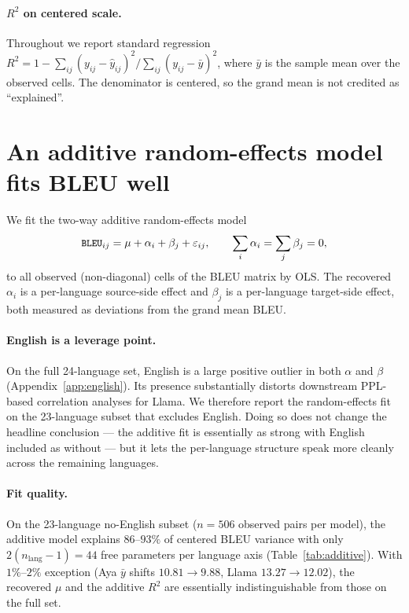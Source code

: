 \documentclass[11pt]{article}
\newcommand{\code}[1]{\texttt{\small #1}}
\begin{document}
\paragraph{$R^2$ on centered scale.}
Throughout we report standard regression $R^2 = 1 - \sum_{ij}(y_{ij} -
\hat y_{ij})^2 / \sum_{ij}(y_{ij} - \bar y)^2$, where $\bar y$ is the
sample mean over the observed cells. The denominator is centered, so
the grand mean is not credited as ``explained''.

\section{An additive random-effects model fits BLEU well}
\label{sec:additive}

We fit the two-way additive random-effects model
\begin{equation}
\code{BLEU}_{ij} = \mu + \alpha_i + \beta_j + \varepsilon_{ij}, \qquad
\sum_i \alpha_i = \sum_j \beta_j = 0,
\label{eq:re}
\end{equation}
to all observed (non-diagonal) cells of the BLEU matrix by OLS. The
recovered $\alpha_i$ is a per-language source-side effect and $\beta_j$
is a per-language target-side effect, both measured as deviations from
the grand mean BLEU.

\paragraph{English is a leverage point.}
On the full 24-language set, English is a large positive outlier in
both $\alpha$ and $\beta$ (Appendix~\ref{app:english}). Its presence
substantially distorts downstream PPL-based correlation analyses for
Llama. We therefore report the random-effects fit on the 23-language
subset that excludes English. Doing so does not change the headline
conclusion --- the additive fit is essentially as strong with English
included as without --- but it lets the per-language structure speak
more cleanly across the remaining languages.

\paragraph{Fit quality.}
On the 23-language no-English subset ($n = 506$ observed pairs per
model), the additive model explains $86$--$93\%$ of centered BLEU
variance with only $2(n_{\text{lang}} - 1) = 44$ free parameters per
language axis (Table~\ref{tab:additive}). With $1\%$--$2\%$ exception
(Aya $\bar y$ shifts $10.81 \to 9.88$, Llama $13.27 \to 12.02$), the
recovered $\mu$ and the additive $R^2$ are essentially indistinguishable
from those on the full set.
\end{document}
